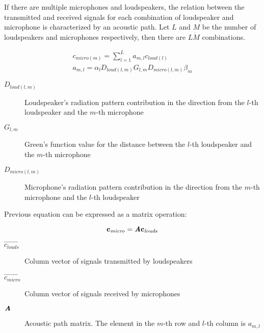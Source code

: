 If there are multiple microphones and loudspeakers, the relation between the transmitted and received signals for each combination of loudspeaker and microphone is characterized by an acoustic path. Let $L$ and $M$ be the number of loudspeakers and microphones respectively, then there are $L \dot M$ combinations.

\begin{gather}
c_{\mathit{micro} (m)} = \sum_{l = 1}^{L} a_{m,l} c_{\mathit{loud} (l)} \label{transEquationCalibrationConcrete} \\
a_{m,l} = \alpha_l D_{loud(l,m)} G_{l,m} D_{micro(l,m)} \beta_m
\label{acPathTheoric}
\end{gather}

\begin{description}
	\item[$D_{loud(l,m)}$] Loudspeaker's radiation pattern contribution in the direction from the $l$-th loudspeaker and the $m$-th microphone
	\item[$G_{l,m}$] Green's function value for the distance between the $l$-th loudspeaker and the $m$-th microphone
	\item[$D_{micro(l,m)}$] Microphone's radiation pattern contribution in the direction from the $m$-th microphone and the $l$-th loudspeaker
\end{description}

Previous equation can be expressed as a matrix operation:

\begin{equation}
\mathbf{c_\mathit{micro}} = \bm{\mathit{A}} \mathbf{c_\mathit{louds}}
\label{transEqMatrix}
\end{equation}

\begin{description}
	\item[$\vec{c_\mathit{louds}}$] Column vector of signals transmitted by loudspeakers
 	\item[$\vec{c_\mathit{micro}}$] Column vector of signals received by microphones
	\item[$\bm{\mathit{A}}$] Acoustic path matrix. The element in the $m$-th row and $l$-th column is $a_{m,l}$
\end{description}



